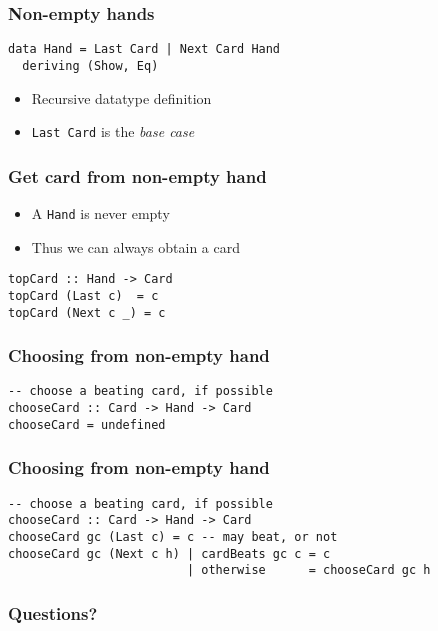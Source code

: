 \documentclass{beamer}
\begin{document}
\begin{frame}[fragile]
  \frametitle{Non-empty hands}
\begin{lstlisting}
data Hand = Last Card | Next Card Hand
  deriving (Show, Eq)
\end{lstlisting}
  \begin{itemize}
  \item  Recursive datatype definition
  \item  \lstinline{Last Card} is the \emph{base case}
  \end{itemize}
\end{frame}
\begin{frame}[fragile]
  \frametitle{Get card from non-empty hand}
  \begin{itemize}
  \item  A \lstinline{Hand} is never empty
  \item  Thus we can always obtain a card
  \end{itemize}
\begin{lstlisting}
topCard :: Hand -> Card
topCard (Last c)  = c
topCard (Next c _) = c
\end{lstlisting}
\end{frame}
\begin{frame}[fragile]
  \frametitle{Choosing from non-empty hand}
\begin{lstlisting}
-- choose a beating card, if possible
chooseCard :: Card -> Hand -> Card
chooseCard = undefined
\end{lstlisting}
\end{frame}
\begin{frame}[fragile]
  \frametitle{Choosing from non-empty hand}
\begin{lstlisting}
-- choose a beating card, if possible
chooseCard :: Card -> Hand -> Card
chooseCard gc (Last c) = c -- may beat, or not
chooseCard gc (Next c h) | cardBeats gc c = c
                         | otherwise      = chooseCard gc h
\end{lstlisting}
\end{frame}

\begin{frame}
  \frametitle{Questions?}
  \begin{center}
  \end{center}
\end{frame}
\end{document}
